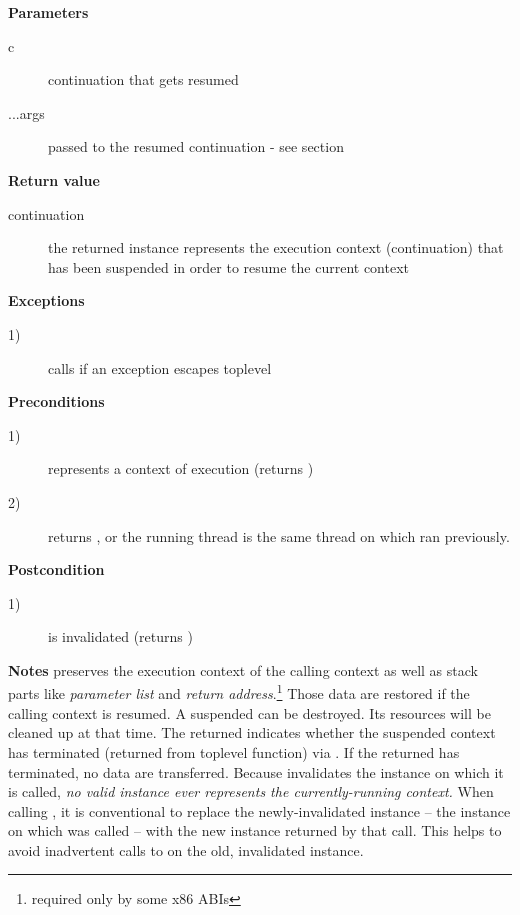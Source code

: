 {\bfseries Parameters}
\begin{description}
    \item[c]       continuation that gets resumed
    \item[...args] passed to the resumed continuation - see section
                   \\
\end{description}

{\bfseries Return value}
\begin{description}
    \item[continuation] the returned instance represents the execution context
                        (continuation) that has been suspended in order to
                        resume the current context
\end{description}

{\bfseries Exceptions}
\begin{description}
    \item[1)] calls  if an exception escapes toplevel
              \\
\end{description}

{\bfseries Preconditions}
\begin{description}
    \item[1)]  represents a context of execution (\opbool returns
               )
    \item[2)]  returns , or the running thread is
              the same thread on which  ran previously.
\end{description}

{\bfseries Postcondition}
\begin{description}
    \item[1)]  is invalidated (\opbool returns )
\end{description}

{\bfseries Notes}
\newline
\resume preserves the execution context of the calling context as well as stack
parts like \emph{parameter list} and \emph{return address}.\footnote{required
only by some x86 ABIs} Those data are restored if the calling context is
resumed.
\newline
A suspended  can be destroyed. Its resources will be cleaned
up at that time.
\newline
The returned  indicates whether the suspended context
has terminated (returned from toplevel function) via \opbool. If the returned
 has terminated, no data are transferred.
\newline
Because \resume invalidates the instance on which it is called, \emph{no valid
\cont instance ever represents the currently-running context.}
\newline
When calling \resume, it is conventional to replace the newly-invalidated
instance -- the instance on which \resume was called -- with the new instance
returned by that \resume call. This helps to avoid inadvertent calls to \resume
on the old, invalidated instance.


